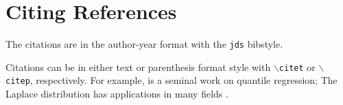 \documentclass[letterpaper,inpress]{jdsart}
\begin{document}
\hypertarget{citing-references}{%
\section{Citing References}\label{citing-references}}

The citations are in the author-year format with the
\texttt{jds} bibstyle.

Citations can be in either text or parenthesis format style with
\texttt{$\backslash$citet} or \texttt{$\backslash$citep},
respectively. For example, \citet{KoenkerBassett1978} is a seminal
work on quantile regression; The Laplace distribution has applications
in many fields \citep{Kotz2001}.



\end{document}
